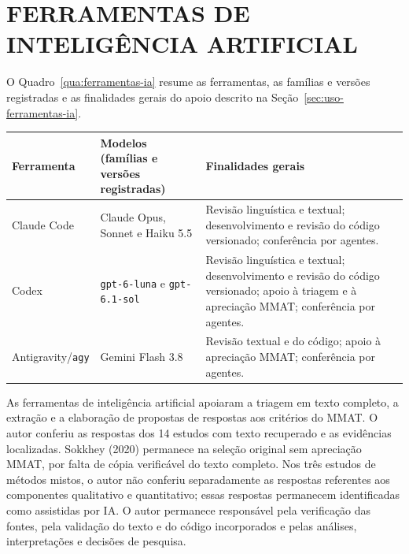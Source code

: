 \chapter{FERRAMENTAS DE INTELIGÊNCIA ARTIFICIAL}
\label{apendice:ferramentas-ia}

O Quadro~\ref{qua:ferramentas-ia} resume as ferramentas, as famílias e versões registradas e as finalidades gerais do apoio descrito na Seção~\ref{sec:uso-ferramentas-ia}.

\begin{quadro}[htbp]
\centering
\caption{Ferramentas de inteligência artificial e finalidades gerais.}
\label{qua:ferramentas-ia}
\begin{tabularx}{\textwidth}{|>{\raggedright\arraybackslash}p{2.4cm}|>{\raggedright\arraybackslash}p{4.1cm}|>{\raggedright\arraybackslash}X|}
\hline
\textbf{Ferramenta} & \textbf{Modelos (famílias e versões registradas)} & \textbf{Finalidades gerais} \\
\hline
Claude Code & Claude Opus, Sonnet e Haiku 5.5 & Revisão linguística e textual; desenvolvimento e revisão do código versionado; conferência por agentes. \\
\hline
Codex & \texttt{gpt-6-luna} e \texttt{gpt-6.1-sol} & Revisão linguística e textual; desenvolvimento e revisão do código versionado; apoio à triagem e à apreciação MMAT; conferência por agentes. \\
\hline
Antigravity/\texttt{agy} & Gemini Flash 3.8 & Revisão textual e do código; apoio à apreciação MMAT; conferência por agentes. \\
\hline
\end{tabularx}
\end{quadro}

As ferramentas de inteligência artificial apoiaram a triagem em texto completo, a extração e a elaboração de propostas de respostas aos critérios do MMAT. O autor conferiu as respostas dos 14 estudos com texto recuperado e as evidências localizadas. Sokkhey (2020) permanece na seleção original sem apreciação MMAT, por falta de cópia verificável do texto completo. Nos três estudos de métodos mistos, o autor não conferiu separadamente as respostas referentes aos componentes qualitativo e quantitativo; essas respostas permanecem identificadas como assistidas por IA. O autor permanece responsável pela verificação das fontes, pela validação do texto e do código incorporados e pelas análises, interpretações e decisões de pesquisa.
